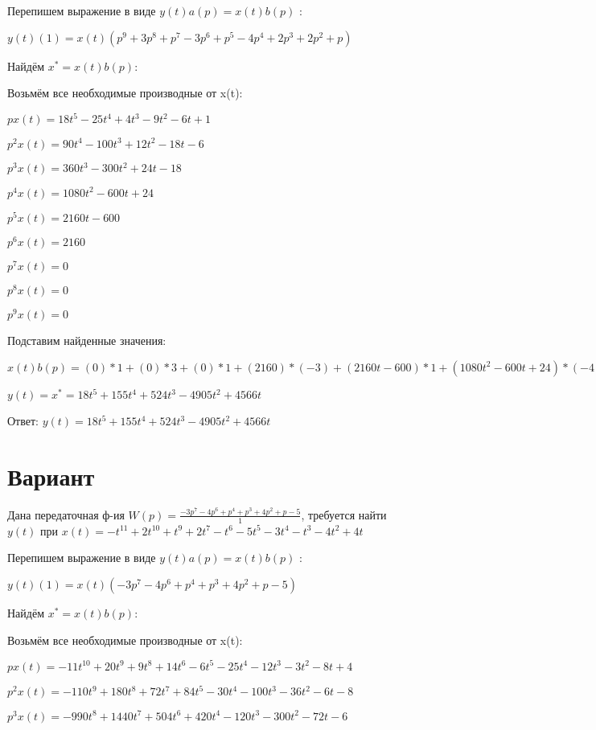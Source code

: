 \documentclass{article}
\begin{document}
{{{Перепишем выражение в виде $y(t)a(p)=x(t)b(p)$ :

$y(t)(1)=x(t)(p^{9}+3p^{8}+p^{7}-3p^{6}+p^{5}-4p^{4}+2p^{3}+2p^{2}+p)$

Найдём $x^*=x(t)b(p)$:

Возьмём все необходимые производные от x(t):

$px(t)=18t^{5}-25t^{4}+4t^{3}-9t^{2}-6t+1$

$p^2x(t)=90t^{4}-100t^{3}+12t^{2}-18t-6$

$p^3x(t)=360t^{3}-300t^{2}+24t-18$

$p^4x(t)=1080t^{2}-600t+24$

$p^5x(t)=2160t-600$

$p^6x(t)=2160$

$p^7x(t)=0$

$p^8x(t)=0$

$p^9x(t)=0$

Подставим найденные значения:

$x(t)b(p) = (0)*1+(0)*3+(0)*1+(2160)*(-3)+(2160t-600)*1+(1080t^{2}-600t+24)*(-4)+(360t^{3}-300t^{2}+24t-18)*2+(90t^{4}-100t^{3}+12t^{2}-18t-6)*2+(18t^{5}-25t^{4}+4t^{3}-9t^{2}-6t+1)*1+=18t^{5}+155t^{4}+524t^{3}-4905t^{2}+4566t$





$y(t)=x^*=18t^{5}+155t^{4}+524t^{3}-4905t^{2}+4566t$

Ответ: $y(t) = 18t^{5}+155t^{4}+524t^{3}-4905t^{2}+4566t$

\section{Вариант}

Дана передаточная ф-ия $W(p)=\frac{-3p^{7}-4p^{6}+p^{4}+p^{3}+4p^{2}+p-5}{1}$, требуется найти $y(t)$ при $x(t)=-t^{11}+2t^{10}+t^{9}+2t^{7}-t^{6}-5t^{5}-3t^{4}-t^{3}-4t^{2}+4t$

Перепишем выражение в виде $y(t)a(p)=x(t)b(p)$ :

$y(t)(1)=x(t)(-3p^{7}-4p^{6}+p^{4}+p^{3}+4p^{2}+p-5)$

Найдём $x^*=x(t)b(p)$:

Возьмём все необходимые производные от x(t):

$px(t)=-11t^{10}+20t^{9}+9t^{8}+14t^{6}-6t^{5}-25t^{4}-12t^{3}-3t^{2}-8t+4$

$p^2x(t)=-110t^{9}+180t^{8}+72t^{7}+84t^{5}-30t^{4}-100t^{3}-36t^{2}-6t-8$

$p^3x(t)=-990t^{8}+1440t^{7}+504t^{6}+420t^{4}-120t^{3}-300t^{2}-72t-6$

}}}
\end{document}
